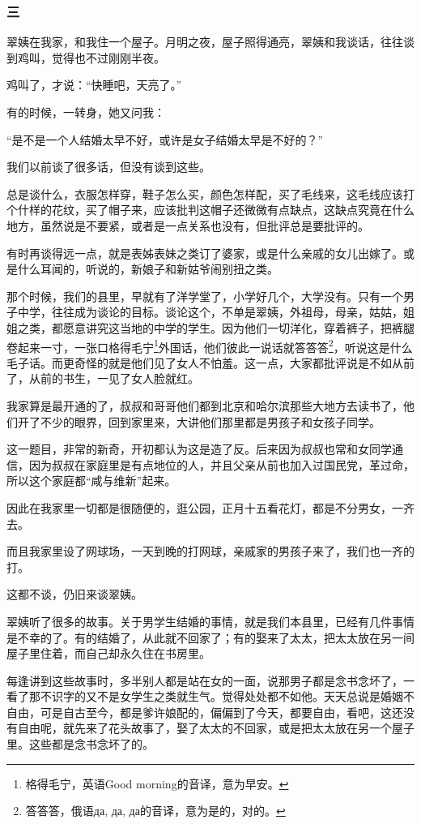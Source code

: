 \subsubsection*{三}
\par 翠姨在我家，和我住一个屋子。月明之夜，屋子照得通亮，翠姨和我谈话，往往谈到鸡叫，觉得也不过刚刚半夜。
\par 鸡叫了，才说：“快睡吧，天亮了。”
\par 有的时候，一转身，她又问我：
\par “是不是一个人结婚太早不好，或许是女子结婚太早是不好的？”
\par 我们以前谈了很多话，但没有谈到这些。
\par 总是谈什么，衣服怎样穿，鞋子怎么买，颜色怎样配，买了毛线来，这毛线应该打个什样的花纹，买了帽子来，应该批判这帽子还微微有点缺点，这缺点究竟在什么地方，虽然说是不要紧，或者是一点关系也没有，但批评总是要批评的。
\par 有时再谈得远一点，就是表姊表妹之类订了婆家，或是什么亲戚的女儿出嫁了。或是什么耳闻的，听说的，新娘子和新姑爷闹别扭之类。
\par 那个时候，我们的县里，早就有了洋学堂了，小学好几个，大学没有。只有一个男子中学，往往成为谈论的目标。谈论这个，不单是翠姨，外祖母，母亲，姑姑，姐姐之类，都愿意讲究这当地的中学的学生。因为他们一切洋化，穿着裤子，把裤腿卷起来一寸，一张口格得毛宁\footnote{格得毛宁，英语Good morning的音译，意为早安。}外国话，他们彼此一说话就答答答\footnote{答答答，俄语да, да, да的音译，意为是的，对的。}，听说这是什么毛子话。而更奇怪的就是他们见了女人不怕羞。这一点，大家都批评说是不如从前了，从前的书生，一见了女人脸就红。
\par 我家算是最开通的了，叔叔和哥哥他们都到北京和哈尔滨那些大地方去读书了，他们开了不少的眼界，回到家里来，大讲他们那里都是男孩子和女孩子同学。
\par 这一题目，非常的新奇，开初都认为这是造了反。后来因为叔叔也常和女同学通信，因为叔叔在家庭里是有点地位的人，并且父亲从前也加入过国民党，革过命，所以这个家庭都“咸与维新”起来。
\par 因此在我家里一切都是很随便的，逛公园，正月十五看花灯，都是不分男女，一齐去。
\par 而且我家里设了网球场，一天到晚的打网球，亲戚家的男孩子来了，我们也一齐的打。
\par 这都不谈，仍旧来谈翠姨。
\par 翠姨听了很多的故事。关于男学生结婚的事情，就是我们本县里，已经有几件事情是不幸的了。有的结婚了，从此就不回家了；有的娶来了太太，把太太放在另一间屋子里住着，而自己却永久住在书房里。
\par 每逢讲到这些故事时，多半别人都是站在女的一面，说那男子都是念书念坏了，一看了那不识字的又不是女学生之类就生气。觉得处处都不如他。天天总说是婚姻不自由，可是自古至今，都是爹许娘配的，偏偏到了今天，都要自由，看吧，这还没有自由呢，就先来了花头故事了，娶了太太的不回家，或是把太太放在另一个屋子里。这些都是念书念坏了的。
